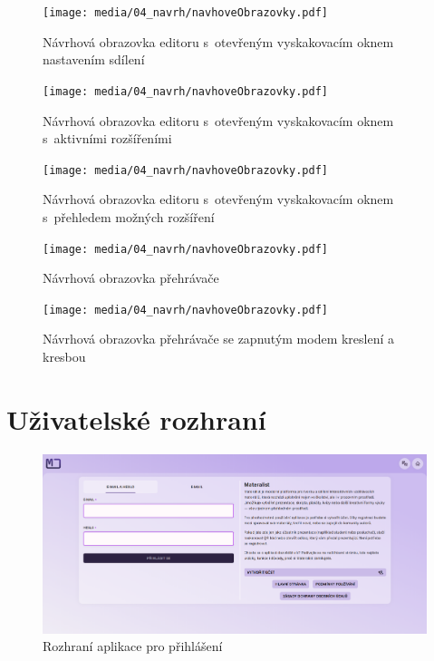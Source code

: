 \begin{figure}[ht!]
    \centering
    \texttt{[image: media/04\_navrh/navhoveObrazovky.pdf]}
    \caption{Návrhová obrazovka editoru s~otevřeným vyskakovacím oknem nastavením sdílení}
\end{figure}

\begin{figure}[ht!]
    \centering
    \texttt{[image: media/04\_navrh/navhoveObrazovky.pdf]}
    \caption{Návrhová obrazovka editoru s~otevřeným vyskakovacím oknem s~aktivními rozšířeními}
\end{figure}

\begin{figure}[ht!]
    \centering
    \texttt{[image: media/04\_navrh/navhoveObrazovky.pdf]}
    \caption{Návrhová obrazovka editoru s~otevřeným vyskakovacím oknem s~přehledem možných rozšíření}
\end{figure}

\begin{figure}[ht!]
    \centering
    \texttt{[image: media/04\_navrh/navhoveObrazovky.pdf]}
    \caption{Návrhová obrazovka přehrávače}
\end{figure}

\begin{figure}[ht!]
    \centering
    \texttt{[image: media/04\_navrh/navhoveObrazovky.pdf]}
    \caption{Návrhová obrazovka přehrávače se zapnutým modem kreslení a kresbou}
\end{figure}




\chapter{Uživatelské rozhraní}\label{appendix:uzivatelskeRozhrani}


\begin{figure}[ht!]
    \centering
    \includegraphics[width=1\textwidth,page=1]{media/appendix/uzivatelskeProstredi.pdf}
    \caption{Rozhraní aplikace pro přihlášení}
\end{figure}

